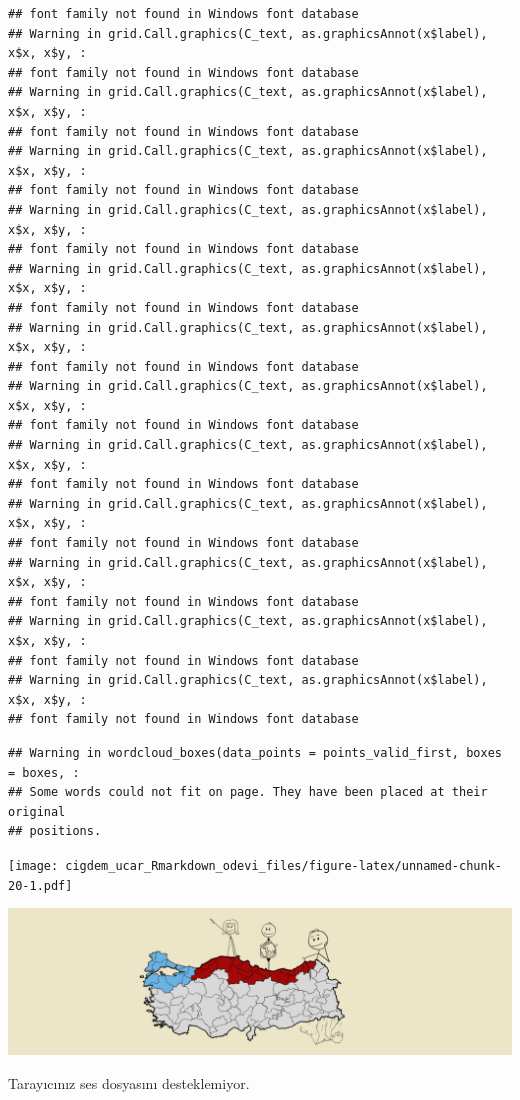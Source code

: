 \documentclass[
]{article}
\begin{document}
\begin{verbatim}
## font family not found in Windows font database
## Warning in grid.Call.graphics(C_text, as.graphicsAnnot(x$label), x$x, x$y, :
## font family not found in Windows font database
## Warning in grid.Call.graphics(C_text, as.graphicsAnnot(x$label), x$x, x$y, :
## font family not found in Windows font database
## Warning in grid.Call.graphics(C_text, as.graphicsAnnot(x$label), x$x, x$y, :
## font family not found in Windows font database
## Warning in grid.Call.graphics(C_text, as.graphicsAnnot(x$label), x$x, x$y, :
## font family not found in Windows font database
## Warning in grid.Call.graphics(C_text, as.graphicsAnnot(x$label), x$x, x$y, :
## font family not found in Windows font database
## Warning in grid.Call.graphics(C_text, as.graphicsAnnot(x$label), x$x, x$y, :
## font family not found in Windows font database
## Warning in grid.Call.graphics(C_text, as.graphicsAnnot(x$label), x$x, x$y, :
## font family not found in Windows font database
## Warning in grid.Call.graphics(C_text, as.graphicsAnnot(x$label), x$x, x$y, :
## font family not found in Windows font database
## Warning in grid.Call.graphics(C_text, as.graphicsAnnot(x$label), x$x, x$y, :
## font family not found in Windows font database
## Warning in grid.Call.graphics(C_text, as.graphicsAnnot(x$label), x$x, x$y, :
## font family not found in Windows font database
## Warning in grid.Call.graphics(C_text, as.graphicsAnnot(x$label), x$x, x$y, :
## font family not found in Windows font database
## Warning in grid.Call.graphics(C_text, as.graphicsAnnot(x$label), x$x, x$y, :
## font family not found in Windows font database
\end{verbatim}

\begin{verbatim}
## Warning in wordcloud_boxes(data_points = points_valid_first, boxes = boxes, :
## Some words could not fit on page. They have been placed at their original
## positions.
\end{verbatim}

\texttt{[image: cigdem\_ucar\_Rmarkdown\_odevi\_files/figure-latex/unnamed-chunk-20-1.pdf]}

\includegraphics[width=19.31in]{son_goruntu}

Tarayıcınız ses dosyasını desteklemiyor.
\end{document}
